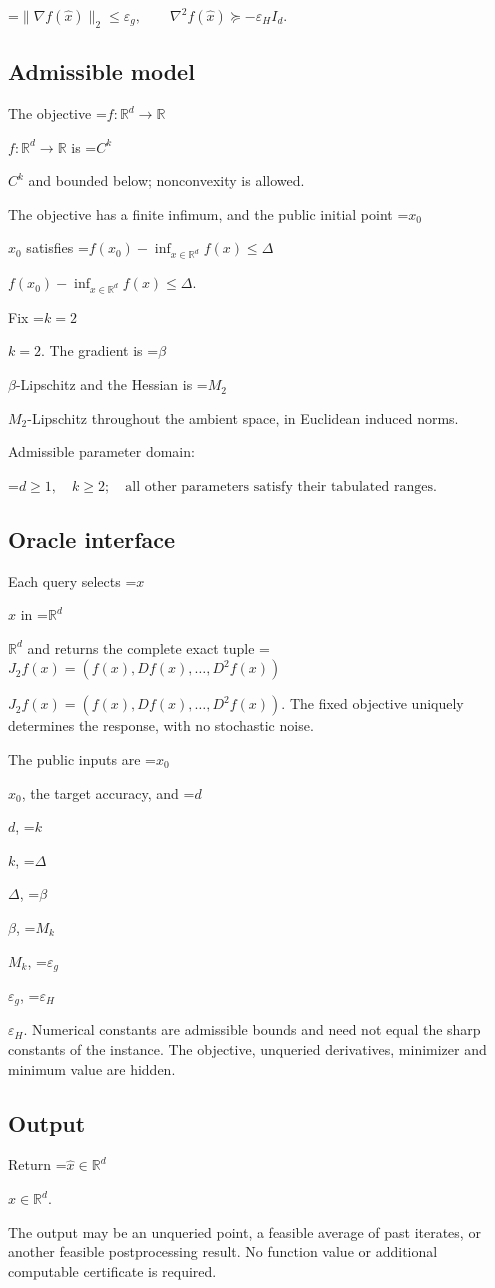 \documentclass[10pt,a4paper]{article}
\newcommand{\AtlasMath}[1]{\par\begingroup\centering\setbox0=\hbox{$\displaystyle #1$}\ifdim\wd0>1.4\linewidth\typeout{ATLAS WIDE FORMULA: \the\wd0}\fi\ifdim\wd0>\linewidth\resizebox{\linewidth}{!}{\box0}\else\box0\fi\par\endgroup}
\newcommand{\AtlasInlineMath}[1]{\begingroup\setbox0=\hbox{$#1$}\ifdim\wd0>.4\linewidth\endgroup\AtlasMath{#1}\else\endgroup$#1$\fi}
\begin{document}
\AtlasMath{\|\nabla f(\widehat{x})\|_2\le\varepsilon_g,\qquad\nabla^2f(\widehat{x})\succeq-\varepsilon_H I_d.}


\subsection{Admissible model}
The objective \AtlasInlineMath{f:\mathbb{R}^d\to\mathbb{R}} is \AtlasInlineMath{C^k} and bounded below; nonconvexity is allowed.

The objective has a finite infimum, and the public initial point \AtlasInlineMath{x_0} satisfies \AtlasInlineMath{f(x_0)-\inf_{x\in \mathbb{R}^d}f(x)\le\Delta}.

Fix \AtlasInlineMath{k=2}. The gradient is \AtlasInlineMath{\beta}-Lipschitz and the Hessian is \AtlasInlineMath{M_2}-Lipschitz throughout the ambient space, in Euclidean induced norms.

Admissible parameter domain:


\AtlasMath{d\ge1,\quad k\ge2;\quad\text{all other parameters satisfy their tabulated ranges}.}


\subsection{Oracle interface}
Each query selects \AtlasInlineMath{x} in \AtlasInlineMath{\mathbb{R}^d} and returns the complete exact tuple \AtlasInlineMath{J_{2}f(x)=(f(x),Df(x),\ldots,D^{2}f(x))}. The fixed objective uniquely determines the response, with no stochastic noise.

The public inputs are \AtlasInlineMath{x_0}, the target accuracy, and \AtlasInlineMath{d}, \AtlasInlineMath{k}, \AtlasInlineMath{\Delta}, \AtlasInlineMath{\beta}, \AtlasInlineMath{M_k}, \AtlasInlineMath{\varepsilon_g}, \AtlasInlineMath{\varepsilon_H}. Numerical constants are admissible bounds and need not equal the sharp constants of the instance. The objective, unqueried derivatives, minimizer and minimum value are hidden.

\subsection{Output}
Return \AtlasInlineMath{\widehat{x}\in \mathbb{R}^d}.

The output may be an unqueried point, a feasible average of past iterates, or another feasible postprocessing result. No function value or additional computable certificate is required.
\end{document}

